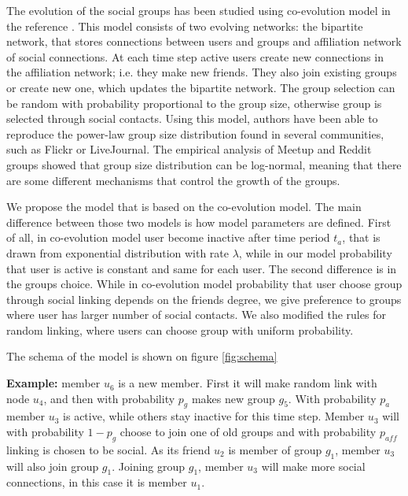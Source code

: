 The evolution of the social groups has been studied using co-evolution model in the reference  \cite{zheleva2009co}. This model consists of two evolving networks: the bipartite network, that stores connections between users and groups and affiliation network of social connections. At each time step active users create new connections in the affiliation network; i.e. they make new friends. They also join existing groups or create new one, which updates the bipartite network. The group selection can be random with probability proportional to the group size, otherwise group is selected through social contacts. Using this model, authors have been able to reproduce the power-law group size distribution found in several communities, such as Flickr or LiveJournal. The empirical analysis of Meetup and Reddit groups showed that group size distribution can be log-normal, meaning that there are some different mechanisms that control the growth of the groups.

We propose the model that is based on the co-evolution model. The main difference between those two models is how model parameters are defined. First of all, in co-evolution model user become inactive after time period $t_a$, that is drawn from exponential distribution with rate $\lambda$, while in our model probability that user is active is constant and same for each user. The second difference is in the groups choice. While in co-evolution model probability that user choose group through social linking depends on the friends degree, we give preference to groups where user has larger number of social contacts. We also modified the rules for random linking, where users can choose group with uniform probability. 





The schema of the model is shown on figure \ref{fig:schema}



\textbf{Example:} member $u_6$ is a new member. First it will make random link  with node $u_4$, and then with probability $p_g$ makes new group $g_5$. With probability $p_a$ member $u_3$ is active, while others stay inactive for this time step. Member $u_3$ will with probability $1-p_g$ choose to join one of old groups and with probability $p_{aff}$ linking is chosen to be social. As its friend $u_2$ is member of group $g_1$, member $u_3$ will also join group $g_1$. Joining group $g_1$, member $u_3$ will make more social connections, in this case it is member $u_1$.


